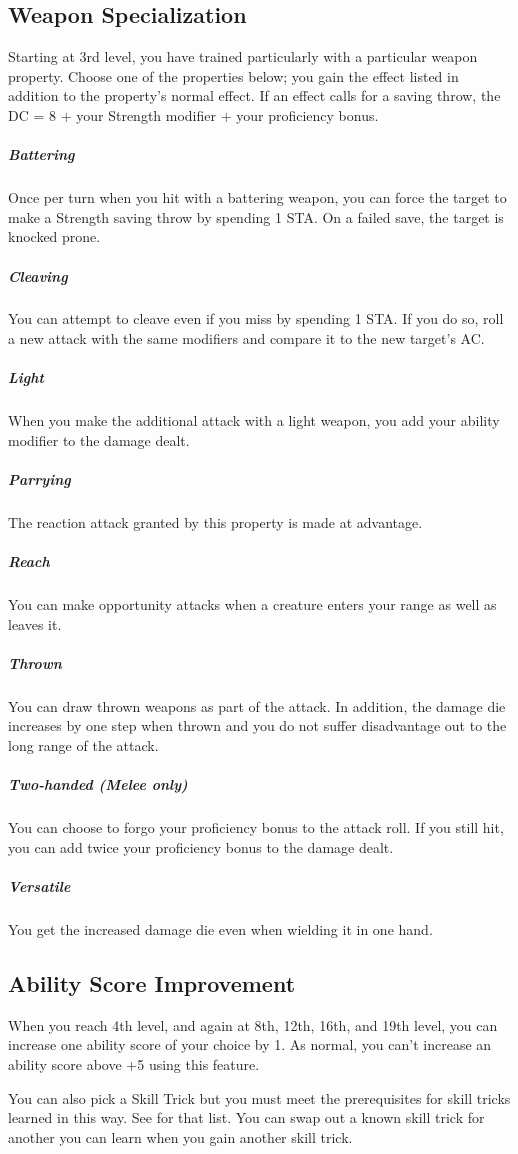 \subsection{Weapon Specialization}

Starting at 3rd level, you have trained particularly with a particular weapon property. Choose one of the properties below; you gain the effect listed in addition to the property's normal effect. If an effect calls for a saving throw, the DC = 8 + your Strength modifier + your proficiency bonus.

\subparagraph*{Battering} Once per turn when you hit with a battering weapon, you can force the target to make a Strength saving throw by spending 1 STA. On a failed save, the target is knocked prone.

\subparagraph*{Cleaving} You can attempt to cleave even if you miss by spending 1 STA. If you do so, roll a new attack with the same modifiers and compare it to the new target's AC.

\subparagraph*{Light} When you make the additional attack with a light weapon, you add your ability modifier to the damage dealt.

\subparagraph*{Parrying} The reaction attack granted by this property is made at advantage.

\subparagraph*{Reach} You can make opportunity attacks when a creature enters your range as well as leaves it.

\subparagraph*{Thrown} You can draw thrown weapons as part of the attack. In addition, the damage die increases by one step when thrown and you do not suffer disadvantage out to the long range of the attack.

\subparagraph*{Two-handed (Melee only)} You can choose to forgo your proficiency bonus to the attack roll. If you still hit, you can add twice your proficiency bonus to the damage dealt.

\subparagraph*{Versatile} You get the increased damage die even when wielding it in one hand.

\subsection{Ability Score Improvement}

When you reach 4th level, and again at 8th, 12th, 16th, and 19th level, you can increase one ability score of your choice by 1.  As normal, you can't increase an ability score above +5 using this feature.

You can also pick a Skill Trick but you must meet the prerequisites for skill tricks learned in this way. See  for that list. You can swap out a known skill trick for another you can learn when you gain another skill trick.

